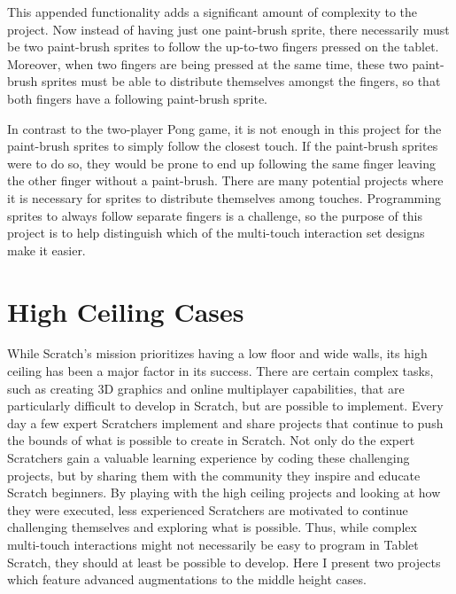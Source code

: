 This appended functionality adds a significant amount of complexity to the project. Now instead of having just one paint-brush sprite, there necessarily must be two paint-brush sprites to follow the up-to-two fingers pressed on the tablet. Moreover, when two fingers are being pressed at the same time, these two paint-brush sprites must be able to distribute themselves amongst the fingers, so that both fingers have a following paint-brush sprite. 

In contrast to the two-player Pong game, it is not enough in this project for the paint-brush sprites to simply follow the closest touch. If the paint-brush sprites were to do so, they would be prone to end up following the same finger leaving the other finger without a paint-brush. There are many potential projects where it is necessary for sprites to distribute themselves among touches. Programming sprites to always follow separate fingers is a challenge, so the purpose of this project is to help distinguish which of the multi-touch interaction set designs make it easier.  

\section{High Ceiling Cases}
While Scratch's mission prioritizes having a low floor and wide walls, its high ceiling has been a major factor in its success. There are certain complex tasks, such as creating 3D graphics and online multiplayer capabilities, that are particularly difficult to develop in Scratch, but are possible to implement. Every day a few expert Scratchers implement and share projects that continue to push the bounds of what is possible to create in Scratch. Not only do the expert Scratchers gain a valuable learning experience by coding these challenging projects, but by sharing them with the community they inspire and educate Scratch beginners. By playing with the high ceiling projects and looking at how they were executed, less experienced Scratchers are motivated to continue challenging themselves and exploring what is possible. Thus, while complex multi-touch interactions might not necessarily be easy to program in Tablet Scratch, they should at least be possible to develop. Here I present two projects which feature advanced augmentations to the middle height cases.

